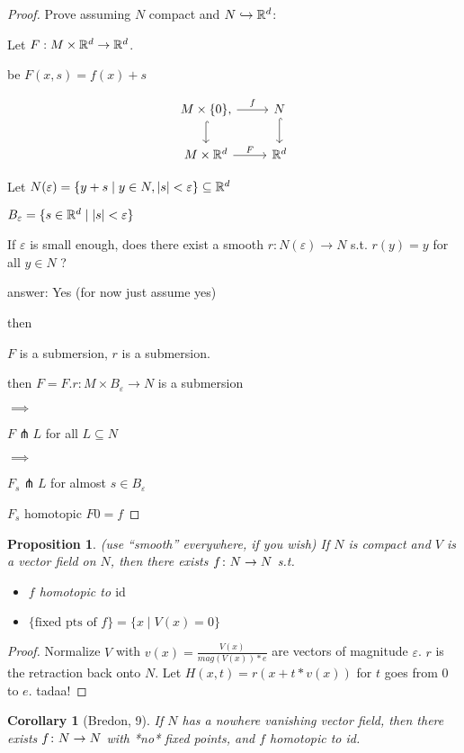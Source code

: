 \documentclass[11pt]{amsbook}
\newenvironment{dateenv}{
	\vspace{1em}
}{
	\vspace{1em}
}
\newcommand{\mydate}[4]{
	\newdate{#1}{#2}{#3}{#4}
	\begin{dateenv}
		\hfill\displaydate{#1}
	\end{dateenv}
}
\theoremstyle{mystyle} %
\newtheorem{coro}[thm]{Corollary}
\newtheorem{propo}[thm]{Proposition}
\numberwithin{thm}{section}
\newcommand{\id}{\text{id}}
\renewcommand{\epsilon}{\varepsilon}
\newcommand{\transverse}{\pitchfork}
\newcommand{\x}{\times}
\begin{document}
\begin{proof}
	Prove assuming $N$ compact and $N \hookrightarrow {\mathbb R}^d$:

	Let $\overset{~}{F}: M \x \R^d \to \R^d$.

	be $\overset{~}{F}(x,s) = f(x) + s$

	$$\begin{tikzcd}
		M \x \{0\} \arrow[r, "f"], \arrow[d, hook] & N \arrow[d, hook] \\
		M \x \R^d \arrow[r, "\overset{~}{F}"] & \R^d
	\end{tikzcd}$$

	Let $N(\epsilon) = \{ y+s \mid y \in N, |s| < \epsilon \} \subseteq \R^d$

	$B_{\epsilon} = \{ s \in \R^d \mid |s| < \epsilon \}$

	If $\epsilon$ is small enough, does there exist a smooth $r : N(\epsilon) \to N$ s.t. $r(y) = y$ for all $y \in N$ ?

	answer: Yes (for now just assume yes)

	then

	$\overset{~}{F}$ is a submersion, $r$ is a submersion.

	then $F = \overset{~}{F}.r : M \x B_\epsilon \to N$ is a submersion

	$\implies$

	$F \transverse L$ for all $L \subseteq N$

	$\implies$

	$F_s \transverse L$ for almost $s \in B_\epsilon$

	$F_s$ homotopic $F0 = f$

\end{proof}
\mydate{d10}{7}{11}{2016}
\begin{propo}
	(use ``smooth'' everywhere, if you wish)
	If $N$ is compact and $V$ is a vector field on $N$, then there exists $f\colon N \to N$ s.t.
	\begin{itemize}
		\item $f$ homotopic to $\id$
		\item $\{ \text{fixed pts of } f \} = \{ x \mid V(x) = 0 \}$
	\end{itemize}
\end{propo}
\begin{proof}
	Normalize $V$ with $v(x) = \frac{V(x)}{mag(V(x))*e}$ are vectors of magnitude $\epsilon$.
	$r$ is the retraction back onto $N$.
	Let $H(x,t) = r(x + t*v(x))$ for $t$ goes from $0$ to $e$.
	tadaa!
\end{proof}
\begin{coro}[Bredon, 9]
	If $N$ has a nowhere vanishing vector field, then there exists $f\colon N \to N$ with *no* fixed points, and $f$ homotopic to id.
\end{coro}
\end{document}
